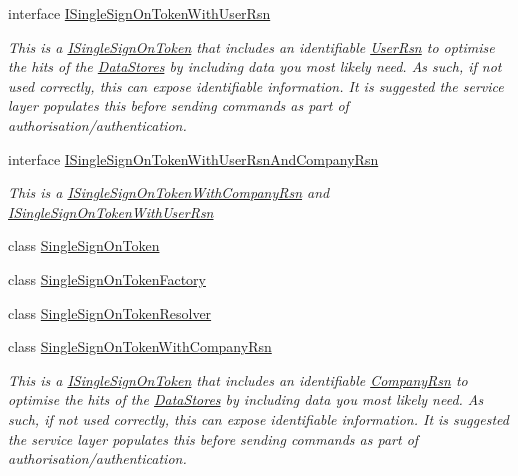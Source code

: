 \begin{DoxyCompactItemize}
interface \hyperlink{interfaceCqrs_1_1Authentication_1_1ISingleSignOnTokenWithUserRsn}{I\+Single\+Sign\+On\+Token\+With\+User\+Rsn}
\begin{DoxyCompactList}\small\item\em This is a \hyperlink{interfaceCqrs_1_1Authentication_1_1ISingleSignOnToken}{I\+Single\+Sign\+On\+Token} that includes an identifiable \hyperlink{interfaceCqrs_1_1Authentication_1_1ISingleSignOnTokenWithUserRsn_a3ba8dbde50e032ebc76c96a5ff40f47f_a3ba8dbde50e032ebc76c96a5ff40f47f}{User\+Rsn} to optimise the hits of the \hyperlink{}{Data\+Stores} by including data you most likely need. As such, if not used correctly, this can expose identifiable information. It is suggested the service layer populates this before sending commands as part of authorisation/authentication. \end{DoxyCompactList}\item 
interface \hyperlink{interfaceCqrs_1_1Authentication_1_1ISingleSignOnTokenWithUserRsnAndCompanyRsn}{I\+Single\+Sign\+On\+Token\+With\+User\+Rsn\+And\+Company\+Rsn}
\begin{DoxyCompactList}\small\item\em This is a \hyperlink{interfaceCqrs_1_1Authentication_1_1ISingleSignOnTokenWithCompanyRsn}{I\+Single\+Sign\+On\+Token\+With\+Company\+Rsn} and \hyperlink{interfaceCqrs_1_1Authentication_1_1ISingleSignOnTokenWithUserRsn}{I\+Single\+Sign\+On\+Token\+With\+User\+Rsn} \end{DoxyCompactList}\item 
class \hyperlink{classCqrs_1_1Authentication_1_1SingleSignOnToken}{Single\+Sign\+On\+Token}
\item 
class \hyperlink{classCqrs_1_1Authentication_1_1SingleSignOnTokenFactory}{Single\+Sign\+On\+Token\+Factory}
\item 
class \hyperlink{classCqrs_1_1Authentication_1_1SingleSignOnTokenResolver}{Single\+Sign\+On\+Token\+Resolver}
\item 
class \hyperlink{classCqrs_1_1Authentication_1_1SingleSignOnTokenWithCompanyRsn}{Single\+Sign\+On\+Token\+With\+Company\+Rsn}
\begin{DoxyCompactList}\small\item\em This is a \hyperlink{interfaceCqrs_1_1Authentication_1_1ISingleSignOnToken}{I\+Single\+Sign\+On\+Token} that includes an identifiable \hyperlink{classCqrs_1_1Authentication_1_1SingleSignOnTokenWithCompanyRsn_abb327084c1ff87de84c92008b4437675_abb327084c1ff87de84c92008b4437675}{Company\+Rsn} to optimise the hits of the \hyperlink{}{Data\+Stores} by including data you most likely need. As such, if not used correctly, this can expose identifiable information. It is suggested the service layer populates this before sending commands as part of authorisation/authentication. \end{DoxyCompactList}\item 

\end{DoxyCompactItemize}
